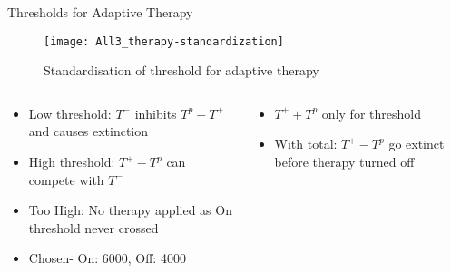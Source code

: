 \begin{frame}{Thresholds for Adaptive Therapy }
  \begin{figure}[h]
    \centering
    \texttt{[image: All3\_therapy-standardization]}
    \caption{Standardisation of threshold for adaptive therapy}
  \end{figure}
  \begin{columns}
    \begin{column}{0.65\textwidth}
      \begin{itemize}
        \item<1-> Low threshold: $T^-$ inhibits $T^p - T^+$ and causes extinction
        \item<2-> High threshold: $T^+ - T^p$ can compete with $T^-$ \cite{Hansen}
        \item<3-> Too High: No therapy applied as On threshold never crossed
        \item<4-> Chosen- On: 6000, Off: 4000
      \end{itemize}
    \end{column}
    \begin{column}{0.4\textwidth}
      \begin{itemize}
        \item<5-> $T^+ + T^p$ only for threshold
        \item<5-> With total: $T^+ - T^p$ go extinct before therapy turned off
      \end{itemize}
    \end{column}
  \end{columns}
\end{frame}

